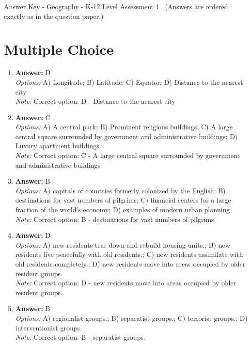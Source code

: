 \documentclass[12pt]{article}
\begin{document}
\begin{center}
Answer Key - Geography - K-12 Level Assessment 1 \
\small (Answers are ordered exactly as in the question paper.)
\end{center}

\section*{Multiple Choice}
\begin{enumerate}[label=\arabic*.]
\item \textbf{Answer:} D
\\ \textit{Options:} A) Longitude; B) Latitude; C) Equator; D) Distance to the nearest city
\\ \textit{Note:} Correct option: D - Distance to the nearest city
\item \textbf{Answer:} C
\\ \textit{Options:} A) A central park; B) Prominent religious buildings; C) A large central square surrounded by government and administrative buildings; D) Luxury apartment buildings
\\ \textit{Note:} Correct option: C - A large central square surrounded by government and administrative buildings
\item \textbf{Answer:} B
\\ \textit{Options:} A) capitals of countries formerly colonized by the English; B) destinations for vast numbers of pilgrims; C) financial centers for a large fraction of the world's economy; D) examples of modern urban planning
\\ \textit{Note:} Correct option: B - destinations for vast numbers of pilgrims
\item \textbf{Answer:} D
\\ \textit{Options:} A) new residents tear down and rebuild housing units.; B) new residents live peacefully with old residents.; C) new residents assimilate with old residents completely.; D) new residents move into areas occupied by older resident groups.
\\ \textit{Note:} Correct option: D - new residents move into areas occupied by older resident groups.
\item \textbf{Answer:} B
\\ \textit{Options:} A) regionalist groups.; B) separatist groups.; C) terrorist groups.; D) interventionist groups.
\\ \textit{Note:} Correct option: B - separatist groups.
\end{enumerate}
\end{document}
